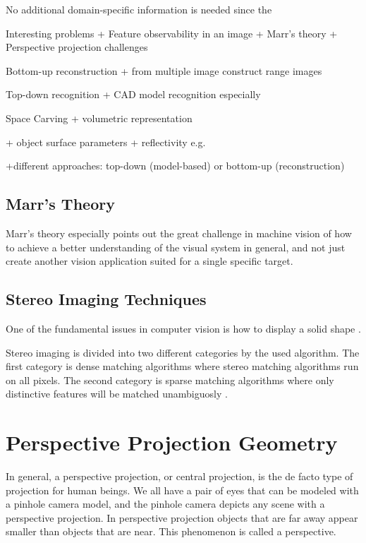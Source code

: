 \documentclass[12pt,a4paper,oneside,pdftex]{report}
\begin{document}
{No additional domain-specific information is needed since the 

Interesting problems
+ Feature observability in an image
+ Marr's theory
+ Perspective projection challenges

Bottom-up reconstruction
    + from multiple image construct range images

Top-down recognition
    + CAD model recognition especially

Space Carving
    + volumetric representation


+ object surface parameters
    + reflectivity e.g.
    
    
+different approaches: top-down (model-based) or bottom-up (reconstruction)



\subsection{Marr's Theory}
\label{subsection:marrs_theory}

Marr's theory especially points out the great challenge in machine vision of how to achieve a better understanding of the visual system in general, and not just create another vision application suited for a single specific target.

\subsection{Stereo Imaging Techniques}
\label{subsection:stereo_imaging_techniques}

One of the fundamental issues in computer vision is how to display a solid shape \cite{Sonka07}. 

Stereo imaging is divided into two different categories by the used algorithm. The first category is dense matching algorithms where stereo matching algorithms run on all pixels. The second category is sparse matching algorithms where only distinctive features will be matched unambiguosly \cite{Terho10}.

\section{Perspective Projection Geometry}
\label{section:perspective_projection_geometry}

In general, a perspective projection, or central projection, is the de facto type of projection for human beings. We all have a pair of eyes that can be modeled with a pinhole camera model, and the pinhole camera depicts any scene with a perspective projection. In perspective projection objects that are far away appear smaller than objects that are near. This phenomenon is called a perspective. 

}
\end{document}
